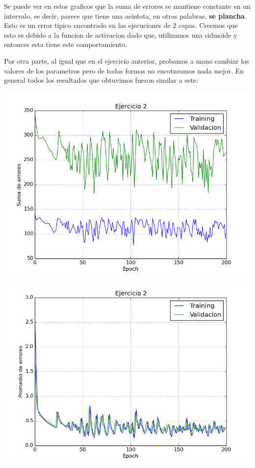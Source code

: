 Se puede ver en estos graficos que la suma de errores se mantiene constante en un intervalo, es decir, parece que tiene una asintota, en otras palabras, \textbf{se plancha}. Esto es un error tipico encontrado en las ejecuciones de 2 capas. Creemos que esto es debido a la funcion de activacion dado que, utilizamos una sidmoide y entonces esta tiene este comportamiento.

Por otra parte, al igual que en el ejercicio anterior, probamos a mano cambiar los valores de los parametros pero de todas formas no encotnramos nada mejor. En general todos los resultados que obtuvimos fueron similar a este:

\includegraphics[scale=0.4]{img/ccsum}
\includegraphics[scale=0.4]{img/bbmean}


